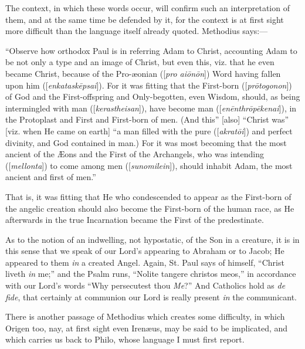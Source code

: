 The context, in which these words occur, will confirm such an
interpretation of them, and at the same time be defended by it, for
the context is at first sight more difficult than the language itself
already quoted. Methodius says:—

``Observe how orthodox Paul is in referring Adam to Christ,
accounting Adam to be not only a type and an image of Christ, but even
this, viz. that he even became Christ, because of the Pro-æonian ([\emph{pro
ai\={o}n\={o}n}]) Word having fallen upon him ([\emph{enkatask\={e}psai}]).
For it was fitting that the First-born ([\emph{pr\={o}togonon}]) of
God and the First-offspring and Only-begotten, even Wisdom, should, as
being intermingled with man ([\emph{kerastheisan}]), have become man
([\emph{en\={e}nthr\={o}p\={e}kenai}]), in the Protoplast and
First and First-born of men. (And this'' [also] ``Christ
was'' [viz. when He came on earth] ``a man filled with the
pure ([\emph{akrat\={o}i}]) and perfect divinity, and God contained
in man.) For it was most becoming that the most ancient of the Æons
and the First of the Archangels, who was intending ([\emph{mellonta}])
to come among men ([\emph{sunomilein}]), should inhabit Adam, the most
ancient and first of men.''

That is, it was fitting that He who condescended to appear as the
First-born of the angelic creation should also become the
First-born of the human race, as He afterwards in the true Incarnation
became the First of the predestinate.

As to the notion of an indwelling, not hypostatic, of the Son in a
creature, it is in this sense that we speak of our Lord's appearing to
Abraham or to Jacob; He appeared to them \emph{in} a created Angel.
Again, St. Paul says of himself, ``Christ liveth \emph{in}
me;'' and the Psalm runs, ``Nolite tangere christos meos,''
in accordance with our Lord's words ``Why persecutest thou \emph{Me}?''
And Catholics hold as \emph{de fide}, that certainly at communion our
Lord is really present \emph{in} the communicant.

There is another passage of Methodius which creates some
difficulty, in which Origen too, nay, at first sight even Irenæus,
may be said to be implicated, and which carries us back to Philo,
whose language I must first report.

